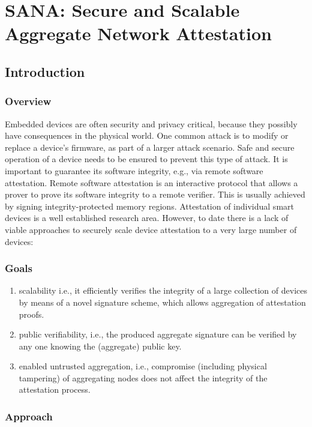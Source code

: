 \documentclass{article}
\begin{document}
\section{SANA: Secure and Scalable Aggregate Network Attestation}

\subsection{Introduction}

\subsubsection{Overview}

Embedded devices are often security and privacy critical, because they possibly have consequences in the physical world. One common attack is to modify or replace a device’s firmware, as part of a larger attack scenario. Safe and secure operation of a device needs to be ensured to prevent this type of attack. It is important to guarantee its software integrity, e.g., via remote software attestation. Remote software attestation is an interactive protocol that allows a prover to prove its software integrity to a remote verifier. This is usually achieved by signing integrity-protected memory regions. Attestation of individual smart devices is a well established research area. However, to date there is a lack of viable approaches to securely scale device attestation to a very large number of devices:

\subsubsection{Goals}

\begin{enumerate}
\item scalability i.e., it efficiently verifies the integrity of a large collection of devices by means of a novel signature scheme, which allows aggregation of attestation proofs.
\item public verifiability, i.e., the produced aggregate signature can be verified by any one knowing the (aggregate) public key.
\item enabled untrusted aggregation, i.e., compromise (including physical tampering) of aggregating nodes does not affect the integrity of the attestation process.
\end{enumerate}

\subsubsection{Approach}
\end{document}
